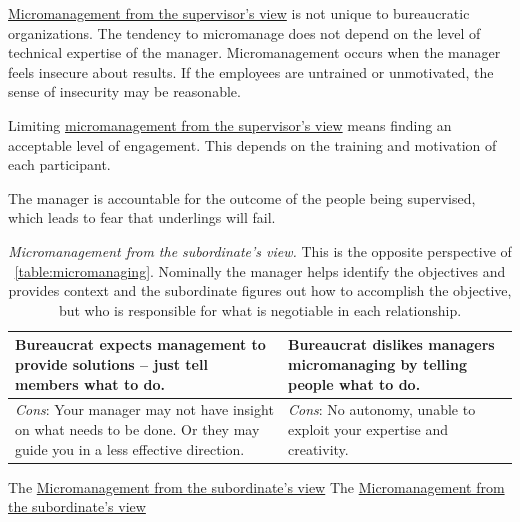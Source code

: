\href{table:micromanaging}{Micromanagement from the supervisor's view} is not unique to bureaucratic organizations. The tendency to micromanage does not depend on the level of technical expertise of the manager. Micromanagement occurs when the manager feels insecure about results. If the employees are untrained or unmotivated, the sense of insecurity may be reasonable.

Limiting \href{table:micromanaging}{micromanagement from the supervisor's view} means finding an acceptable level of engagement. This depends on the training and motivation of each participant. 

The manager is accountable for the outcome of the people being supervised, which leads to fear that underlings will fail. 

\begin{center}
\begin{table}[H] %
\begin{tabular}{ | m{\dilemmatablewidth}| m{\dilemmatablewidth} | } 
  \hline
  \textbf{Bureaucrat expects management to provide solutions -- just tell members what to do.} & 
  \textbf{Bureaucrat dislikes managers micromanaging by telling people what to do.} \\ 
  \hline
  \textit{Cons}: Your manager may not have insight on what needs to be done. Or they may guide you in a less effective direction. &
  \textit{Cons}: No autonomy, unable to exploit your expertise and creativity. \\  
  \hline
\end{tabular}
\caption{\textit{Micromanagement from the subordinate's view.}
This is the opposite perspective of \ref{table:micromanaging}. Nominally the manager helps identify the objectives and provides context and the subordinate figures out how to accomplish the objective, but who is responsible for what is negotiable in each relationship.
}
\label{table:solution_provider}
\end{table}
\end{center}

The \href{table:solution_provider}{Micromanagement from the subordinate's view}
The \href{table:solution_provider}{Micromanagement from the subordinate's view}
  

